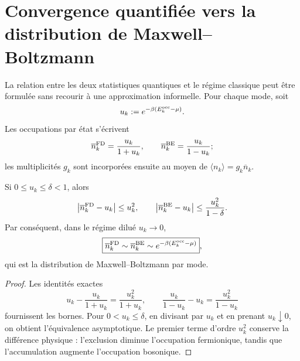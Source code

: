 \clearpage
\section{Convergence quantifiée vers la distribution de Maxwell--Boltzmann}
\label{v:v:rec:ocupacion:section:03}

La relation entre les deux statistiques quantiques et le régime classique peut
être formulée sans recourir à une approximation informelle. Pour chaque mode, soit
\[
 u_k:=e^{-\beta(E_k^{\rm occ}-\mu)}.
\]
Les occupations par état s’écrivent
\[
 \overline n_k^{\rm FD}=\frac{u_k}{1+u_k},
 \qquad
 \overline n_k^{\rm BE}=\frac{u_k}{1-u_k};
\]
les multiplicités \(g_k\) sont incorporées ensuite au moyen de
\(\langle n_k\rangle=g_k\overline n_k\).

\begin{theorem}
\label{v:v:rec:thm:limite-clasico-fd-be-rev2}
Si \(0\leq u_k\leq\delta<1\), alors
\[
 \left|\overline n_k^{\rm FD}-u_k\right|\leq u_k^2,
 \qquad
 \left|\overline n_k^{\rm BE}-u_k\right|
 \leq\frac{u_k^2}{1-\delta}.
\]
Par conséquent, dans le régime dilué \(u_k\to0\),
\[
 \boxed{
 \overline n_k^{\rm FD}\sim
 \overline n_k^{\rm BE}\sim
 e^{-\beta(E_k^{\rm occ}-\mu)}} ,
\]
qui est la distribution de Maxwell--Boltzmann par mode.
\end{theorem}

\begin{proof}
Les identités exactes
\[
 u_k-\frac{u_k}{1+u_k}=\frac{u_k^2}{1+u_k},
 \qquad
 \frac{u_k}{1-u_k}-u_k=\frac{u_k^2}{1-u_k}
\]
fournissent les bornes. Pour \(0<u_k\leq\delta\), en divisant par \(u_k\) et
en prenant \(u_k\downarrow0\), on obtient
l’équivalence asymptotique. Le premier terme d’ordre \(u_k^2\) conserve la
différence physique : l’exclusion diminue l’occupation fermionique, tandis que
l’accumulation augmente l’occupation bosonique.
\end{proof}
